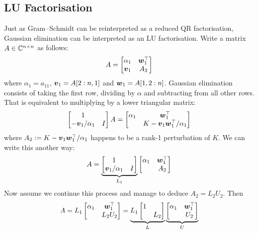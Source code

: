 \subsection{LU Factorisation}
Just as Gram\ensuremath{\endash}Schmidt can be reinterpreted as a reduced QR factorisation, Gaussian elimination  can be interpreted as an LU factorisation. Write a matrix $A \in {\mathbb C}^{n \times n}$ as follows:
\[
A =  \begin{bmatrix} \alpha_1 & \bm{{\mbox{\boldmath$w$\unboldmath}}}_1^\top \\ \bm{{\mbox{\boldmath$v$\unboldmath}}}_1 & A_2 \end{bmatrix}
\]
where $\ensuremath{\alpha}_1 = a_{11}$, $\bm{{\mbox{\boldmath$v$\unboldmath}}}_1 = A[2:n, 1]$ and $\bm{{\mbox{\boldmath$w$\unboldmath}}}_1 = A[1, 2:n]$. Gaussian elimination consists of taking the first row, dividing by $\ensuremath{\alpha}$ and subtracting from all other rows. That is equivalent to multiplying by a lower triangular matrix:
\[
\begin{bmatrix}
1 \\
-\bm{{\mbox{\boldmath$v$\unboldmath}}}_1/\alpha_1 & I \end{bmatrix} A = \begin{bmatrix} \alpha_1 & \bm{{\mbox{\boldmath$w$\unboldmath}}}_1^\top \\  & K -\bm{{\mbox{\boldmath$v$\unboldmath}}}_1\bm{{\mbox{\boldmath$w$\unboldmath}}}_1^\top /\alpha_1 \end{bmatrix}
\]
where $A_2 := K -\bm{{\mbox{\boldmath$v$\unboldmath}}}_1 \bm{{\mbox{\boldmath$w$\unboldmath}}}_1^\top/\alpha_1$  happens to be a rank-1 perturbation of $K$.  We can write this another way:
\[
A = \underbrace{\begin{bmatrix}
1 \\
\bm{{\mbox{\boldmath$v$\unboldmath}}}_1/\alpha_1 & I \end{bmatrix}}_{L_1}  \begin{bmatrix} \alpha_1 & \bm{{\mbox{\boldmath$w$\unboldmath}}}_1^\top \\  & A_2 \end{bmatrix}
\]
Now assume we continue this process and manage to deduce $A_2 = L_2 U_2$. Then
\[
A = L_1 \begin{bmatrix} \alpha_1 & \bm{{\mbox{\boldmath$w$\unboldmath}}}_1^\top \\  & L_2U_2 \end{bmatrix}
= \underbrace{L_1 \begin{bmatrix}
1 \\
 & L_2 \end{bmatrix}}_L  \underbrace{\begin{bmatrix} \alpha_1 & \bm{{\mbox{\boldmath$w$\unboldmath}}}_1^\top \\  & U_2 \end{bmatrix}}_U
\]

